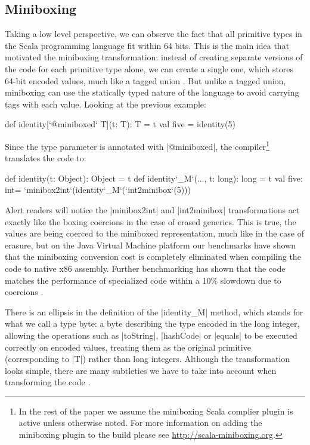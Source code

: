 \subsection{Miniboxing}

Taking a low level perspective, we can observe the fact that all primitive types in the Scala programming language fit within 64 bits. This is the main idea that motivated the miniboxing transformation: instead of creating separate versions of the code for each primitive type alone, we can create a single one, which stores 64-bit encoded values, much like a tagged union \cite{tagged-unions-lua}. But unlike a tagged union, miniboxing can use the statically typed nature of the language to avoid carrying tags with each value. Looking at the previous example:

\begin{lstlisting-nobreak}
 def identity[`@miniboxed` T](t: T): T = t
 val five = identity(5)
\end{lstlisting-nobreak}

Since the type parameter is annotated with |@miniboxed|, the compiler\footnote{In the rest of the paper we assume the miniboxing Scala complier plugin is active unless otherwise noted. For more information on adding the miniboxing plugin to the build please see \url{http://scala-miniboxing.org}.} translates the code to:

\begin{lstlisting-nobreak}
 def identity(t: Object): Object = t
 def identity`_M`(..., t: long): long = t
 val five: int= `minibox2int`(identity`_M`(`int2minibox`(5)))
\end{lstlisting-nobreak}

Alert readers will notice the |minibox2int| and |int2minibox| transformations act exactly like the boxing coercions in the case of  erased generics. This is true, the values are being coerced to the miniboxed representation, much like in the case of erasure, but on the Java Virtual Machine platform our benchmarks have shown that the miniboxing conversion cost is completely eliminated when compiling the code to native x86 assembly. Further benchmarking has shown that the code matches the performance of specialized code within a 10\% slowdown due to coercions \cite{miniboxing}.

There is an ellipsis in the definition of the |identity_M| method, which stands for what we call a type byte: a byte describing the type encoded in the long integer, allowing the operations such as |toString|, |hashCode| or |equals| to be executed correctly on encoded values, treating them as the original primitive (corresponding to |T|) rather than long integers. Although the transformation looks simple, there are many subtleties we have to take into account when transforming the code \cite{miniboxing,miniboxing-linkedlist,ldl}.

